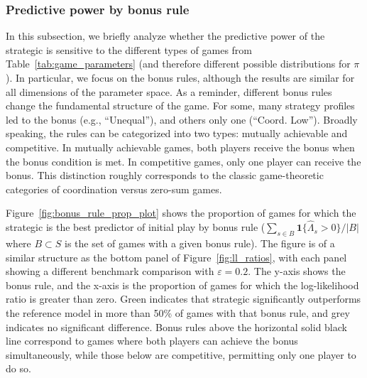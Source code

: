 \subsubsection{Predictive power by bonus rule}

In this subsection, we briefly analyze whether the predictive power of the strategic \aisub{} is sensitive to the different types of games from Table~\ref{tab:game_parameters} (and therefore different possible distributions for $\pi$).
In particular, we focus on the bonus rules, although the results are similar for all dimensions of the parameter space.
As a reminder, different bonus rules change the fundamental structure of the game.
For some, many strategy profiles led to the bonus (e.g., ``Unequal''), and others only one (``Coord. Low'').
Broadly speaking, the rules can be categorized into two types: mutually achievable and competitive.
In mutually achievable games, both players receive the bonus when the bonus condition is met.
In competitive games, only one player can receive the bonus.
This distinction roughly corresponds to the classic game-theoretic categories of coordination versus zero-sum games.

Figure~\ref{fig:bonus_rule_prop_plot} shows the proportion of games for which the strategic \aisub{} is the best predictor of initial play by bonus rule ($\sum_{s \in B} \mathbf 1\{\hat \Lambda_s > 0\} / |B|$ where $B \subset S$ is the set of games with a given bonus rule).
The figure is of a similar structure as the bottom panel of Figure~\ref{fig:ll_ratios}, with each panel showing a different benchmark comparison with $\varepsilon = 0.2$.
The y-axis shows the bonus rule, and the x-axis is the proportion of games for which the log-likelihood ratio is greater than zero.
Green indicates that strategic \aisub{} significantly outperforms the reference model in more than 50\% of games with that bonus rule, and grey indicates no significant difference.
Bonus rules above the horizontal solid black line correspond to games where both players can achieve the bonus simultaneously, while those below are competitive, permitting only one player to do so.

